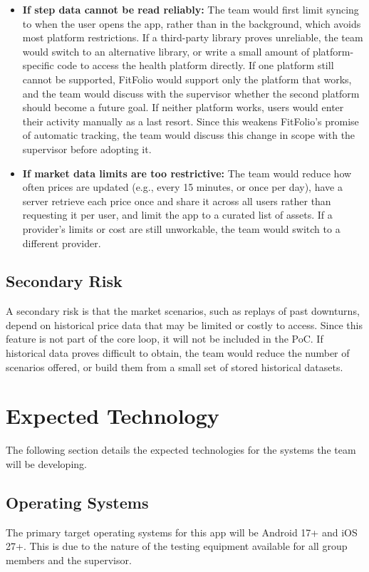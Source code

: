 \documentclass{article}
\begin{document}
\begin{itemize}
  \item \textbf{If step data cannot be read reliably:} The team would first limit syncing to when the user opens the app, rather than in the background, which avoids most platform restrictions. If a third-party library proves unreliable, the team would switch to an alternative library, or write a small amount of platform-specific code to access the health platform directly.
  If one platform still cannot be supported, FitFolio would support only the platform that works, and the team would discuss with the supervisor whether the second platform should become a future goal. 
  If neither platform works, users would enter their activity manually as a last resort. Since this weakens FitFolio's promise of automatic tracking, the team would discuss this change in scope with the supervisor before adopting it.
  \item \textbf{If market data limits are too restrictive:} The team would reduce how often prices are updated (e.g., every 15 minutes, or once per day), have a server retrieve each price once and share it across all users rather than requesting it per user, and limit the app to a curated list of assets. 
  If a provider's limits or cost are still unworkable, the team would switch to a different provider.
\end{itemize}

\subsection{Secondary Risk}

A secondary risk is that the market scenarios, such as replays of past downturns, depend on historical price data that may be limited or costly to access. 
Since this feature is not part of the core loop, it will not be included in the PoC. If historical data proves difficult to obtain, the team would reduce the number of scenarios offered, or build them from a small set of stored historical datasets.

\section{Expected Technology}
The following section details the expected technologies for the systems the team will be developing. \newline
\subsection{Operating Systems}
The primary target operating systems for this app will be Android 17+ and iOS 27+. This is due to the nature of the testing equipment available
for all group members and the supervisor.
\end{document}
